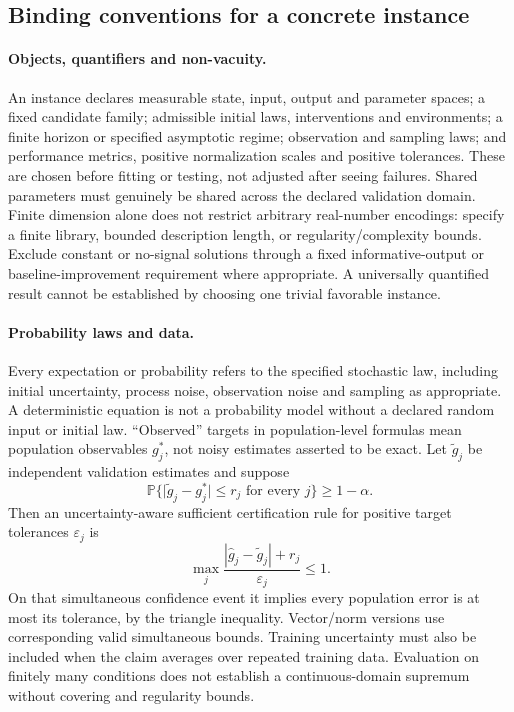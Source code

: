 \documentclass[11pt]{article}
\begin{document}
\subsection*{Binding conventions for a concrete instance}
\paragraph{Objects, quantifiers and non-vacuity.}
An instance declares measurable state, input, output and parameter spaces; a fixed candidate family; admissible initial laws, interventions and environments; a finite horizon or specified asymptotic regime; observation and sampling laws; and performance metrics, positive normalization scales and positive tolerances. These are chosen before fitting or testing, not adjusted after seeing failures. Shared parameters must genuinely be shared across the declared validation domain. Finite dimension alone does not restrict arbitrary real-number encodings: specify a finite library, bounded description length, or regularity/complexity bounds. Exclude constant or no-signal solutions through a fixed informative-output or baseline-improvement requirement where appropriate. A universally quantified result cannot be established by choosing one trivial favorable instance.

\paragraph{Probability laws and data.}
Every expectation or probability refers to the specified stochastic law, including initial uncertainty, process noise, observation noise and sampling as appropriate. A deterministic equation is not a probability model without a declared random input or initial law. ``Observed'' targets in population-level formulas mean population observables $g_j^*$, not noisy estimates asserted to be exact. Let $\widetilde g_j$ be independent validation estimates and suppose
\[
\mathbb{P}\{\lvert\widetilde g_j-g_j^*\rvert\le r_j\text{ for every }j\}\ge1-\alpha.
\]
Then an uncertainty-aware sufficient certification rule for positive target tolerances $\varepsilon_j$ is
\[
\max_j\frac{|\widehat g_j-\widetilde g_j|+r_j}{\varepsilon_j}\le1.
\]
On that simultaneous confidence event it implies every population error is at most its tolerance, by the triangle inequality. Vector/norm versions use corresponding valid simultaneous bounds. Training uncertainty must also be included when the claim averages over repeated training data. Evaluation on finitely many conditions does not establish a continuous-domain supremum without covering and regularity bounds.
\end{document}
